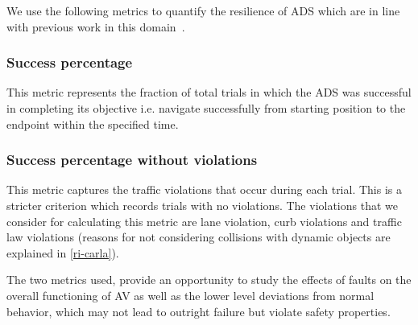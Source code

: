 We use the following metrics to quantify the resilience of ADS which are in line with previous work in this domain~\cite{avfi}.

 \setcounter{subsubsection}{0}
 
 \medskip
 \subsubsection{Success percentage} This metric represents the fraction of total trials in which the ADS was successful in completing its objective i.e. navigate successfully from starting position to the endpoint within the specified time.

\smallskip

\subsubsection{Success percentage without violations} This metric captures the traffic violations that occur during each trial. This is a stricter criterion which records trials with no violations. The violations that we consider for calculating this metric are lane violation, curb violations and traffic law violations (reasons for not considering collisions with dynamic objects are explained in \ref{ri-carla}). 

The two metrics used, provide an opportunity to study the effects of faults on the overall functioning of AV as well as the lower level deviations from normal behavior, which may not lead to outright failure but violate safety properties.
 
